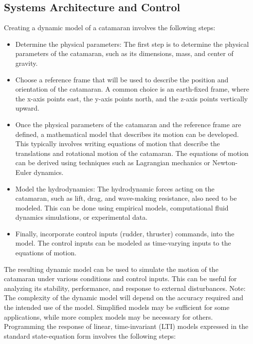 \documentclass{article}
\begin{document}
\subsection{Systems Architecture and Control}
Creating a dynamic model of a catamaran involves the following steps:
    \begin{itemize}

    \item Determine the physical parameters: The first step is to determine the physical parameters of the catamaran, such as its dimensions, mass, and center of gravity. 

    \item Choose a reference frame that will be used to describe the position and orientation of the catamaran. A common choice is an earth-fixed frame, where the x-axis points east, the y-axis points north, and the z-axis points vertically upward.

    \item Once the physical parameters of the catamaran and the reference frame are defined, a mathematical model that describes its motion can be developed. This typically involves writing equations of motion that describe the translations and rotational motion of the catamaran. The equations of motion can be derived using techniques such as Lagrangian mechanics or Newton-Euler dynamics.

    \item Model the hydrodynamics: The hydrodynamic forces acting on the catamaran, such as lift, drag, and wave-making resistance, also need to be modeled. This can be done using empirical models, computational fluid dynamics simulations, or experimental data.

    \item  Finally, incorporate control inputs (rudder, thruster) commands, into the model. The control inputs can be modeled as time-varying inputs to the equations of motion.
\end{itemize}
The resulting dynamic model can be used to simulate the motion of the catamaran under various conditions and control inputs. This can be useful for analyzing its stability, performance, and response to external disturbances. Note: The complexity of the dynamic model will depend on the accuracy required and the intended use of the model. Simplified models may be sufficient for some applications, while more complex models may be necessary for others.
Programming the response of linear, time-invariant (LTI) models expressed in the standard state-equation form involves the following steps:
\end{document}
